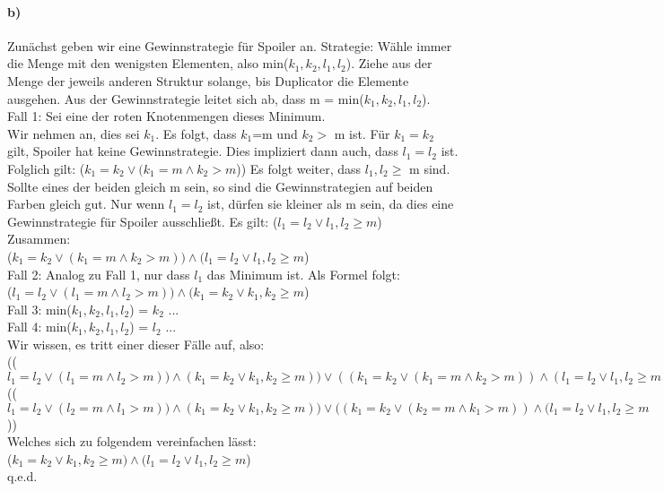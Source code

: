 \documentclass[12pt]{article}
\begin{document}
 \paragraph{b)}
 Zunächst geben wir eine Gewinnstrategie für Spoiler an. Strategie: Wähle immer die Menge mit den wenigsten Elementen, also min($k_1,k_2,l_1,l_2$). Ziehe aus der Menge der jeweils anderen Struktur solange, bis Duplicator die Elemente ausgehen. 
 Aus der Gewinnstrategie leitet sich ab, dass m = min($k_1,k_2,l_1,l_2$). \\
 Fall 1: Sei eine der roten Knotenmengen dieses Minimum. \\
 Wir nehmen an, dies sei $k_1$. Es folgt, dass $k_1$=m und $k_2 >$  m ist. Für $k_1=k_2$ gilt, Spoiler hat keine Gewinnstrategie. Dies impliziert dann auch, dass $l_1=l_2$ ist. Folglich gilt: ($k_1=k_2 \lor (k_1 = m \land k_2 > m$))
 Es folgt weiter, dass $l_1,l_2 \geq$ m sind. Sollte eines der beiden gleich m sein, so sind die Gewinnstrategien auf beiden Farben gleich gut. Nur wenn $l_1=l_2$ ist, dürfen sie kleiner als m sein, da dies eine Gewinnstrategie für Spoiler ausschließt. Es gilt: ($l_1=l_2 \lor l_1,l_2 \geq m$)\\ 
 Zusammen:\\
 ($k_1=k_2 \lor (k_1 = m \land k_2 > m)) \land (l_1=l_2 \lor l_1,l_2 \geq m$)\\
 Fall 2: Analog zu Fall 1, nur dass $l_1$ das Minimum ist. Als Formel folgt:\\
 ($l_1=l_2 \lor (l_1 = m \land l_2 > m)) \land (k_1=k_2 \lor k_1,k_2 \geq m$)\\
 Fall 3: min($k_1,k_2,l_1,l_2$) = $k_2$ ...\\
 Fall 4: min($k_1,k_2,l_1,l_2$) = $l_2$ ...\\
 Wir wissen, es tritt einer dieser Fälle auf, also:\\
 (($l_1=l_2 \lor (l_1 = m \land l_2 > m)) \land (k_1=k_2 \lor k_1,k_2 \geq m)) \lor ((k_1=k_2 \lor (k_1 = m \land k_2 > m)) \land (l_1=l_2 \lor l_1,l_2 \geq m)) \lor $\\
  (($l_1=l_2 \lor (l_2 = m \land l_1 > m)) \land (k_1=k_2 \lor k_1,k_2 \geq m)) \lor ((k_1=k_2 \lor (k_2 = m \land k_1 > m)) \land (l_1=l_2 \lor l_1,l_2 \geq m$))\\
 Welches sich zu folgendem vereinfachen lässt:\\
 ($k_1=k_2 \lor k_1,k_2 \geq m) \land (l_1=l_2 \lor l_1,l_2 \geq m$) \\
 q.e.d.\\
 
\end{document}
